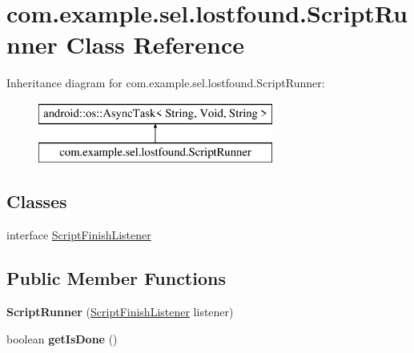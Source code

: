 \hypertarget{classcom_1_1example_1_1sel_1_1lostfound_1_1ScriptRunner}{}\section{com.\+example.\+sel.\+lostfound.\+Script\+Runner Class Reference}
\label{classcom_1_1example_1_1sel_1_1lostfound_1_1ScriptRunner}
Inheritance diagram for com.\+example.\+sel.\+lostfound.\+Script\+Runner\+:\begin{figure}[H]
\begin{center}
\leavevmode
\includegraphics[height=2.000000cm]{classcom_1_1example_1_1sel_1_1lostfound_1_1ScriptRunner}
\end{center}
\end{figure}
\subsection*{Classes}
\begin{DoxyCompactItemize}
\item 
interface \hyperlink{interfacecom_1_1example_1_1sel_1_1lostfound_1_1ScriptRunner_1_1ScriptFinishListener}{Script\+Finish\+Listener}
\end{DoxyCompactItemize}
\subsection*{Public Member Functions}
\begin{DoxyCompactItemize}
\item 
{\bfseries Script\+Runner} (\hyperlink{interfacecom_1_1example_1_1sel_1_1lostfound_1_1ScriptRunner_1_1ScriptFinishListener}{Script\+Finish\+Listener} listener)\hypertarget{classcom_1_1example_1_1sel_1_1lostfound_1_1ScriptRunner_a89fe364ebf708a526d2271b2aaad65dc}{}\label{classcom_1_1example_1_1sel_1_1lostfound_1_1ScriptRunner_a89fe364ebf708a526d2271b2aaad65dc}

\item 
boolean {\bfseries get\+Is\+Done} ()\hypertarget{classcom_1_1example_1_1sel_1_1lostfound_1_1ScriptRunner_a9f6500f6f9fda5c4230dbbba9724b8bd}{}\label{classcom_1_1example_1_1sel_1_1lostfound_1_1ScriptRunner_a9f6500f6f9fda5c4230dbbba9724b8bd}

\end{DoxyCompactItemize}
